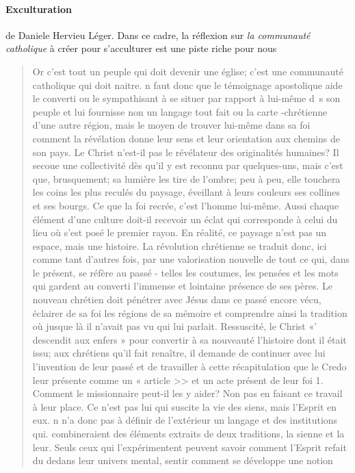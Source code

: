  \paragraph{Exculturation} de Daniele Hervieu Léger. Dans ce cadre, la réflexion sur \textit{la communauté catholique} à créer pour s'acculturer est une piste riche pour nous  
 \begin{quote}
     Or c'est tout
un peuple qui doit devenir une église; c'est une communauté
catholique qui doit naitre.  n faut donc que
le témoignage apostolique aide le converti ou le sympathisant
à se situer par  rapport à lui-même d~s son
peuple et lui fournisse non un langage tout fait ou la
carte -chrétienne d'une autre région, mais le moyen de
trouver lui-même dans sa foi comment la révélation
donne leur sens et leur orientation aux chemins de son
pays. Le Christ n'est-il pas le  révélateur des originalités
humaines? Il secoue une collectivité dès qu'il y est
reconnu par quelques-uns, mais c'est que, brusquement;
sa lumière les tire de l'ombre; peu à peu, elle touchera
les coins les plus  reculés du paysage, éveillant à leurs
couleurs ses collines et ses bourgs. Ce que la foi  recrée,
c'est l'homme lui-même. Aussi chaque élément d'une
culture doit-il recevoir un éclat qui corresponde à celui
du lieu où s'est posé le premier rayon. En  réalité, ce
paysage n'est pas un espace, mais une histoire. La révolution
chrétienne se traduit donc, ici comme tant d'autres
fois, par une valorisation nouvelle de tout ce qui, dans
le présent, se  réfère au passé - telles les coutumes, les
pensées et les mots qui gardent au converti l'immense
et lointaine présence de ses pères. Le nouveau chrétien
doit pénétrer avec Jésus dans ce passé encore vécu,
éclairer de sa foi les régions de sa mémoire et comprendre
ainsi la tradition où jusque là il n'avait pas vu
qui lui parlait. Ressuscité, le Christ «' descendit aux
enfers » pour convertir à sa nouveauté l'histoire dont
 il était issu; aux chrétiens qu'il fait renaître, il demande
de continuer avec lui l'invention de leur passé et de
travailler à cette récapitulation que le Credo leur présente
comme un « article >> et un acte présent de leur
foi 1.
Comment le missionnaire peut-il les y aider? Non pas
en faisant ce travail à leur place. Ce n'est pas lui qui suscite la vie des siens, mais l'Esprit en eux. n n'a donc
pas à définir de l'extérieur un langage et des institutions
qui. combineraient des éléments extraits de deux traditions,
la sienne et la leur. Seuls ceux qui l'expérimentent
peuvent savoir comment l'Esprit refait du dedans leur
univers mental, sentir comment se développe une notion

\end{quote}
